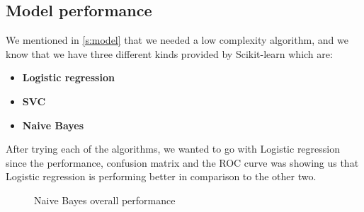 \subsection{Model performance}
We mentioned in \ref{s:model} that we needed a low complexity algorithm, and we know that we have three different kinds
provided by Scikit-learn which are:
\begin{itemize}
	\item \textbf{Logistic regression}
	\item \textbf{SVC}
	\item \textbf{Naive Bayes}
\end{itemize}
After trying each of the algorithms, we wanted to go with Logistic regression since the performance, confusion matrix
and the ROC curve was showing us that Logistic regression is performing better in comparison to the other two.
\\[5pt]
\begin{figure}[H]
	\centering
	\hspace{5pt}
	\hspace{5pt}
	\caption{Naive Bayes overall performance}
	\label{fig:naive_bayes_perf}
\end{figure}
